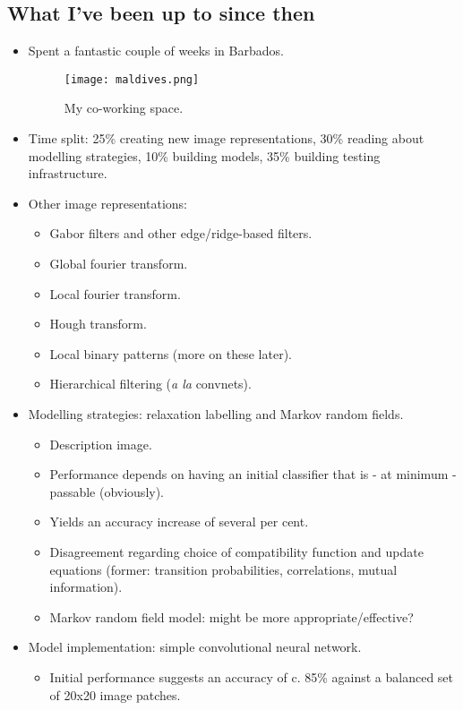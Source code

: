 \documentclass[11pt]{article} %
\begin{document}
\subsection*{What I've been up to since then}
\begin{itemize}
	\item Spent a fantastic couple of weeks in Barbados.
	\begin{figure}[h!]
		\centering
		\texttt{[image: maldives.png]}
		\caption{My co-working space.}
	\end{figure}
	\item Time split: 25\% creating new image representations, 30\% reading about modelling strategies, 10\% building models, 35\% building testing infrastructure.
	\item Other image representations:
		\begin{itemize}
			\item Gabor filters and other edge/ridge-based filters.
			\item Global fourier transform.
			\item Local fourier transform.
			\item Hough transform.
			\item Local binary patterns (more on these later).
			\item Hierarchical filtering (\emph{a la} convnets).
		\end{itemize}
	\item Modelling strategies: relaxation labelling and Markov random fields.
		\begin{itemize}
			\item Description image.
			\item Performance depends on having an initial classifier that is - at minimum - passable (obviously).
			\item Yields an accuracy increase of several per cent.
			\item Disagreement regarding choice of compatibility function and update equations (former: transition probabilities, correlations, mutual information).
			\item Markov random field model:  might be more appropriate/effective?
		\end{itemize}
	\item Model implementation: simple convolutional neural network.
		\begin{itemize}
			\item Initial performance suggests an accuracy of c. 85\% against a balanced set of 20x20 image patches.

\end{itemize}
\end{itemize}
\end{document}
